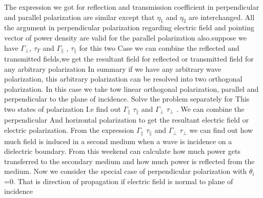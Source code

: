 The expression we got for reflection and transmission coefficient in perpendicular  and parallel  polarization  are similar except  that $\eta_{1}$ and $\eta_{2}$ are interchanged. All the argument in perpendicular  polarization  regarding  electric  field and pointing vector of power density are valid for the parallel  polarization  also.suppose we have $\Gamma_{\perp}$, $\tau_{T}$ and $\Gamma_{\parallel}$ , $\tau_{\parallel}$ for this two Case we can combine the reflected and transmitted fields,we get the resultant field for reflected or transmitted field for any arbitrary  polarization 
In summary if we have any arbitrary  wave polarization, this arbitrary  polarization  can be resolved into two orthogonal polarization. In this case we take tow linear orthogonal  polarization, parallel  and perpendicular  to the plane  of incidence. Solve the problem separately for This two states of polarization I.e find out $\Gamma_{\parallel}$  $\tau_{\parallel}$ and $\Gamma_{\bot}$ $\tau_{\perp}$ . We can combine the perpendicular And  horizontal polarization to get the resultant electric field or electric polarization. From the expression $\Gamma_{\parallel}$  $\tau_{\parallel}$ and $\Gamma_{\bot}$ $\tau_{\bot}$ we can find out how much field is induced in a second medium when a wave is incidence on a dielectric  boundary. From this weekend can calculate  how much power gets transferred to the secondary medium  and how much power is reflected from the medium. 
Now we consider the special case of perpendicular polarization with  $\theta_{i}$=0. That is direction of propagation if electric  field is normal to plane of incidence
